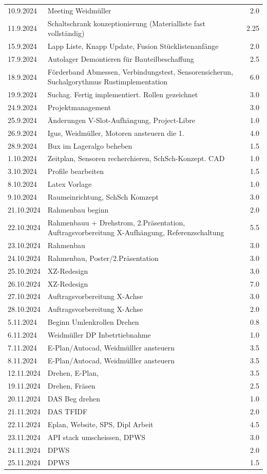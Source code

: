 \begin{longtable}{|l|p{10cm}|r|}
10.9.2024	&Meeting Weidmüller&	2.0	\\
11.9.2024	&Schaltschrank konzeptionierung (Materialliste fast vollständig)	&2.25\\


15.9.2024	&Lapp Liste, Knapp Update, Fusion Stücklistenanfänge	&2.0\\

17.9.2024	&Autolager Demontieren für Bauteilbeschaffung&	2.5\\
18.9.2024	&Förderband Abmessen, Verbindungstest, Sensorensicherun, Suchalgorythmus Rustimplementation &6.0\\
19.9.2024	&Suchag. Fertig implementiert. Rollen gezeichnet	&3.0\\

24.9.2024	&Projektmanagement&	3.0\\
25.9.2024	&Änderungen V-Slot-Aufhängung, Project-Libre	&1.0\\

26.9.2024	&Igus, Weidmüller, Motoren ansteuern die 1.&	4.0\\
28.9.2024	&Bux im Lageralgo beheben	&1.5\\

1.10.2024	&Zeitplan, Sensoren recherchieren, SchSch-Konzept. CAD	&1.0\\
3.10.2024	&Profile bearbeiten	&1.5\\
8.10.2024	&Latex Vorlage	&1.0\\
9.10.2024	&Raumeinrichtung, SchSch Komzept&	3.0\\
21.10.2024	&Rahmenbau beginn&	2.0\\
22.10.2024	&Rahmenbauu + Drehstrom, 2.Präsentation, Auftragsvorbereitung X-Aufhängung, Referenzschaltung &5.5\\
23.10.2024	&Rahmenbau	&3.0\\
24.10.2024	&Rahmenbau, Poster/2.Präsentation	&3.0\\
25.10.2024	&XZ-Redesign	&3.0	\\
26.10.2024	&XZ-Redesign	&7.0	\\
27.10.2024	&Auftragsvorbereitung X-Achse	&3.0\\
28.10.2024	&Auftragsvorbereitung X-Achse	&2.0	\\

5.11.2024	&Beginn Umlenkrollen Drehen	&0.8\\
6.11.2024	&Weidmüller DP Inbetrtiebnahme&	1.0\\
7.11.2024	&E-Plan/Autocad, Weidmülller ansteuern&	3.5\\
8.11.2024	&E-Plan/Autocad, Weidmülller ansteuern&	3.5\\
12.11.2024	&Drehen, E-Plan, &	3.5\\
19.11.2024	&Drehen, Fräsen	&2.5\\
20.11.2024	&DAS Beg drehen	&1.0\\
21.11.2024	&DAS TFIDF	&2.0\\
22.11.2024	&Eplan, Website, SPS, Dipl Arbeit	&4.5\\
23.11.2024	&API stack umscheissen, DPWS	&3.0\\
24.11.2024	&DPWS	&2.0\\
25.11.2024	&DPWS	&1.5\\


\end{longtable}
